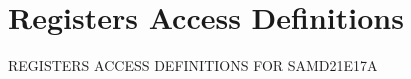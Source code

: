 \hypertarget{group___s_a_m_d21_e17_a__reg}{}\section{Registers Access Definitions}
\label{group___s_a_m_d21_e17_a__reg}
R\+E\+G\+I\+S\+T\+E\+RS A\+C\+C\+E\+SS D\+E\+F\+I\+N\+I\+T\+I\+O\+NS F\+OR S\+A\+M\+D21\+E17A 